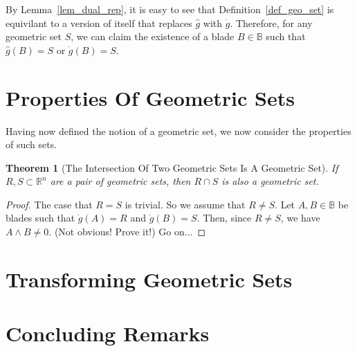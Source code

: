 \documentclass{birkjour}
\newtheorem{thm}{Theorem}[section]
\theoremstyle{definition}
\theoremstyle{remark}
\numberwithin{equation}{section}
\newcommand{\R}{\mathbb{R}}
\newcommand{\B}{\mathbb{B}}
\newcommand{\gd}{\dot{g}}
\newcommand{\gh}{\hat{g}}
\begin{document}
By Lemma~\ref{lem_dual_rep}, it is easy to see that Definition~\ref{def_geo_set} is equivilant to a version of itself that replaces $\gh$ with $\gd$.
Therefore, for any geometric set $S$, we can claim the existence of a blade $B\in\B$ such that $\gh(B)=S$ or $\gd(B)=S$.

\section{Properties Of Geometric Sets}

Having now defined the notion of a geometric set, we now consider the properties of such sets.

\begin{thm}[The Intersection Of Two Geometric Sets Is A Geometric Set]
If $R,S\subset\R^n$ are a pair of geometric sets, then $R\cap S$ is also a geometric set.
\end{thm}
\begin{proof}
The case that $R=S$ is trivial.  So we assume that $R\neq S$.
Let $A,B\in\B$ be blades such that $\gd(A)=R$ and $\gd(B)=S$.
Then, since $R\neq S$, we have $A\wedge B\neq 0$.  (Not obvious!  Prove it!)
Go on...
\end{proof}





\section{Transforming Geometric Sets}


\section{Concluding Remarks}

\end{document}
